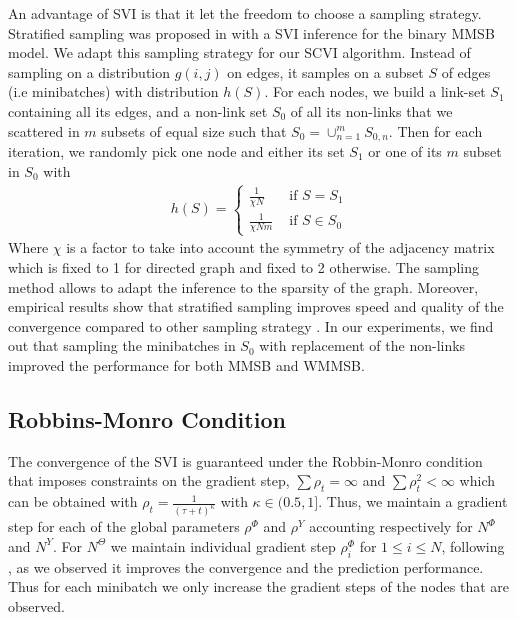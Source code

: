 An advantage of SVI is that it let the freedom to choose a sampling strategy. Stratified sampling was proposed in \cite{gopalan2013efficient} with a SVI inference for the binary MMSB model. We adapt this sampling strategy for our SCVI algorithm. Instead of sampling on a distribution $g(i,j)$ on edges, it samples on a subset $S$ of edges (i.e minibatches) with distribution $h(S)$. For each nodes, we build a link-set $S_1$ containing all its edges, and a non-link set $S_0$ of all its non-links that we scattered in $m$ subsets of equal size such that $S_0 = \cup_{n=1}^m S_{0,n}$. Then for each iteration, we randomly pick one node and either its set $S_1$ or one of its $m$ subset in $S_0$ with
\begin{align*}
h(S)=\begin{cases}
    \frac{1}{\chi N}  & \textrm{ if } S = S_1 \\
    \frac{1}{\chi N m}  & \textrm{ if } S \in S_0 
    \end{cases}
\end{align*}
Where $\chi$ is a factor to take into account the symmetry of the adjacency matrix which is fixed to 1 for directed graph and fixed to 2 otherwise. The sampling method allows to adapt the inference to the sparsity of the graph. Moreover, empirical results show that stratified sampling improves speed and quality of the convergence compared to other sampling strategy \cite{gopalan2013efficient}\cite{kim2013efficient}. In our experiments, we find out that sampling the minibatches in $S_0$ with replacement of the non-links improved the performance for both MMSB and WMMSB.

\subsection{Robbins-Monro Condition}

The convergence of the SVI is guaranteed under the Robbin-Monro condition \cite{robbins1951stochastic} that imposes constraints on the gradient step, $\sum \rho_t = \infty$ and $\sum \rho_t^2 < \infty$ which can be obtained with $\rho_t = \frac{1}{(\tau +t)^\kappa}$ with $\kappa \in (0.5, 1]$. Thus, we maintain a gradient step for each of the global parameters $\rho^\Phi$ and $\rho^Y$ accounting respectively for  $N^\Phi$ and $N^Y$. For $N^\Theta$ we maintain individual gradient step $\rho_i^{\Phi}$ for $1\leq i\leq N$, following \cite{miller2009nonparametric}, as we observed it improves the convergence and the prediction performance. Thus for each minibatch we only increase the gradient steps of the nodes that are observed.

